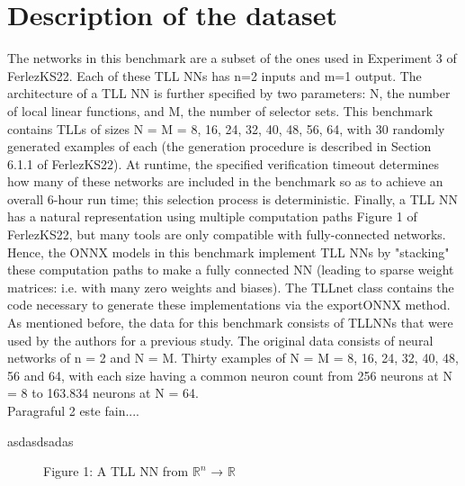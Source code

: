 \documentclass[12pt,a4paper]{report}
\newcommand\tab[1][5mm]{\hspace*{#1}}
\theoremstyle{definition}
\theoremstyle{remark}
\begin{document}
\chapter{Description of the dataset}
\tab The networks in this benchmark are a subset of the ones used in Experiment 3 of FerlezKS22\cite{tll_fast_algorithm}. Each of these TLL NNs has n=2 inputs and m=1 output. The architecture of a TLL NN is further specified by two parameters: N, the number of local linear functions, and M, the number of selector sets. This benchmark contains TLLs of sizes N = M = 8, 16, 24, 32, 40, 48, 56, 64, with 30 randomly generated examples of each (the generation procedure is described in Section 6.1.1 of FerlezKS22\cite{tll_fast_algorithm}). At runtime, the specified verification timeout determines how many of these networks are included in the benchmark so as to achieve an overall 6-hour run time; this selection process is deterministic. Finally, a TLL NN has a natural representation using multiple computation paths Figure 1 of FerlezKS22\cite{tll_fast_algorithm}, but many tools are only compatible with fully-connected networks. Hence, the ONNX models in this benchmark implement TLL NNs by "stacking" these computation paths to make a fully connected NN (leading to sparse weight matrices: i.e. with many zero weights and biases). The TLLnet\cite{tll_net} class contains the code necessary to generate these implementations via the exportONNX method.\cite{tll_git}\\
As mentioned before, the data for this benchmark consists of TLLNNs that were used by the authors for a previous study. The original data consists of neural networks of n = 2 and N = M. Thirty examples of N = M = 8, 16, 24, 32, 40, 48, 56 and 64, with each size having a common neuron count from 256 neurons at N = 8 to 163.834 neurons at N = 64. \\

Paragraful 2 este fain....

asdasdsadas

\begin{figure}[H]
\centering
{}
\caption{Figure 1: A TLL NN from \(\mathbb{R}^n\) → \(\mathbb{R}\)\cite{relu_architecture}}
\label{fig:relu_architecture}
\end{figure}
\end{document}
